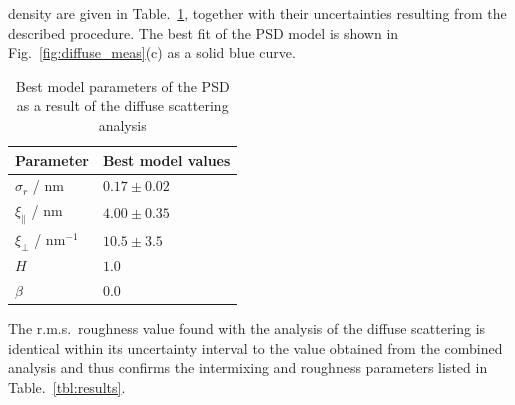 density are given in Table.~\ref{tbl:psd_results}, together with their 
uncertainties resulting from the described procedure. The best fit of the PSD 
model is shown in Fig.~\ref{fig:diffuse_meas}(c) as a solid blue curve.
\begin{table}
\centering
\caption{Best model parameters of the PSD as a result of the diffuse scattering 
analysis}
\label{tbl:psd_results}
\begin{tabular}{@{}ll@{}}
\toprule
Parameter & Best model values\\ \midrule
$\sigma_r$ / nm & $0.17 \pm 0.02$ \\
$\xi_\parallel$ / nm& $4.00 \pm 0.35$ \\
$\xi_\perp$  / nm$^{-1}$& $10.5 \pm 3.5$ \\
$H$ & $1.0$ \\
$\beta$ & $0.0$ \\
 \bottomrule
\end{tabular}
\end{table}
The r.m.s.~roughness value found with the analysis of the diffuse scattering is 
identical within its uncertainty interval to the value obtained from the 
combined analysis and thus confirms the intermixing and roughness parameters 
listed in Table.~\ref{tbl:results}.
